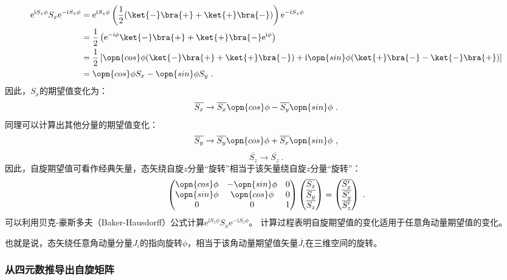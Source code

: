 \begin{equation}
\begin{aligned}
\mathrm e^{\mathrm i S_z\phi}S_x\mathrm e^{-\mathrm i S_z\phi}&=\mathrm e^{\mathrm i S_z\phi}\left(\frac{1}{2}(\ket{-}\bra{+}+\ket{+}\bra{-})\right)\mathrm e^{-\mathrm i S_z\phi}\\
 &=\frac{1}{2}\left(\mathrm e^{-\mathrm i \phi}\ket{-}\bra{+}+\ket{+}\bra{-}\mathrm e^{\mathrm i \phi}\right)\\
 &=\frac{1}{2}\left[\opn{cos}\phi(\ket{-}\bra{+}+\ket{+}\bra{-})+\mathrm i\opn{sin}\phi(\ket{+}\bra{-}-\ket{-}\bra{+})\right]\\
 &=\opn{cos}\phi S_x-\opn{sin}\phi S_y~.
\end{aligned}
\end{equation}
因此，$S_x$的期望值变化为：
\begin{equation}
\overline{S_x}\rightarrow  \overline{S_x}\opn{cos}\phi-\overline{S_y}\opn{sin}\phi~.
\end{equation}
同理可以计算出其他分量的期望值变化：
\begin{equation}
\overline{S_y}\rightarrow \overline{S_y}\opn{cos}\phi+\overline{S_x}\opn{sin}\phi~,
\end{equation}
\begin{equation}
\overline{S_z}\rightarrow \overline{S_z}~.
\end{equation}
因此，自旋期望值可看作经典矢量，态矢绕自旋$z$分量“旋转”相当于该矢量绕自旋$z$分量“旋转”：
\begin{equation}
\begin{pmatrix}
 \opn{cos}\phi &-\opn{sin}\phi  &0 \\
  \opn{sin}\phi & \opn{cos}\phi  & 0\\
  0& 0 &1
\end{pmatrix}
\begin{pmatrix}
 \overline{S_x}\\
  \overline{S_y}\\
 \overline{S_z}
\end{pmatrix}
=
\begin{pmatrix}
  \overline{S'_x}\\
  \overline{S'_y}\\
 \overline{S'_z}
\end{pmatrix}~.
\end{equation}
可以利用贝克-豪斯多夫（Baker-Hausdorff）公式计算$\mathrm e^{\mathrm i S_z\phi}S_x\mathrm e^{-\mathrm i S_z\phi}$。
计算过程表明自旋期望值的变化适用于任意角动量期望值的变化。

也就是说，态矢绕任意角动量分量$J_i$的指向旋转$\phi$，相当于该角动量期望值矢量$\overline{J_i}$在三维空间的旋转。

\subsubsection{从四元数推导出自旋矩阵}
